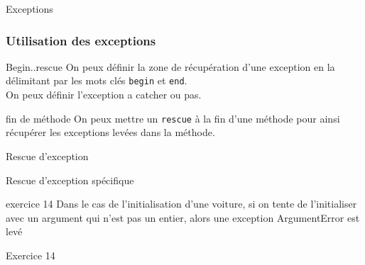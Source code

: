 \documentclass{beamer}
\begin{document}
\begin{frame}
  \begin{beamerboxesrounded}{Exceptions}
    
  \end{beamerboxesrounded}
\end{frame}

\begin{frame}
  \frametitle{Utilisation des exceptions}
  \begin{block}{Begin..rescue}
    On peux d\'efinir la zone de r\'ecup\'eration d'une exception en
    la d\'elimitant par les mots cl\'es \verb?begin? et \verb?end?.
    \\
    On peux d\'efinir l'exception a catcher ou pas.
  \end{block}
  \begin{block}{fin de m\'ethode}
    On peux mettre un \verb?rescue? à la fin d'une m\'ethode pour ainsi
    r\'ecup\'erer les exceptions lev\'ees dans la m\'ethode.
  \end{block}
\end{frame}

\begin{frame}
  \begin{beamerboxesrounded}{Rescue d'exception}
    
  \end{beamerboxesrounded}
\end{frame}

\begin{frame}
  \begin{beamerboxesrounded}{Rescue d'exception sp\'ecifique}
    
  \end{beamerboxesrounded}
\end{frame}

\begin{frame}
  \begin{block}{exercice 14}
    Dans le cas de l'initialisation d'une voiture, si on tente de l'initialiser
    avec un argument qui n'est pas un entier, alors une exception ArgumentError
    est lev\'e\\
  \end{block}
\end{frame}

\begin{frame}
  \begin{beamerboxesrounded}{Exercice 14}
    
  \end{beamerboxesrounded}
\end{frame}
\end{document}
